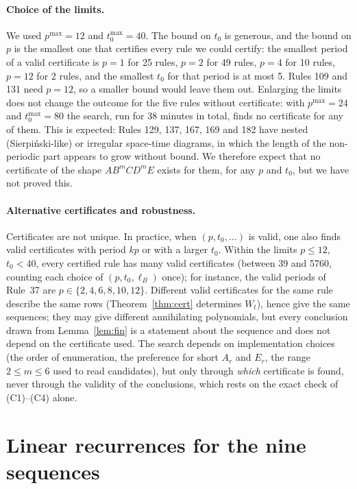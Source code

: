 \documentclass[11pt]{article}
\theoremstyle{definition}
\theoremstyle{remark}
\begin{document}
\paragraph{Choice of the limits.} We used $p^{\max}=12$ and $t_0^{\max}=40$. The bound on $t_0$ is generous, and the bound on $p$ is the smallest one that certifies every rule we could certify: the smallest period of a valid certificate is $p=1$ for 25 rules, $p=2$ for 49 rules, $p=4$ for 10 rules, $p=12$ for 2 rules, and the smallest $t_0$ for that period is at most 5. Rules 109 and 131 need $p=12$, so a smaller bound would leave them out. Enlarging the limits does not change the outcome for the five rules without certificate: with $p^{\max}=24$ and $t_0^{\max}=80$ the search, run for 38 minutes in total, finds no certificate for any of them. This is expected: Rules 129, 137, 167, 169 and 182 have nested (Sierpi\'nski-like) or irregular space-time diagrams, in which the length of the non-periodic part appears to grow without bound. We therefore expect that no certificate of the shape $AB^mCD^mE$ exists for them, for any $p$ and $t_0$, but we have not proved this.

\paragraph{Alternative certificates and robustness.} Certificates are not unique. In practice, when $(p,t_0,\dots)$ is valid, one also finds valid certificates with period $kp$ or with a larger $t_0$. Within the limits $p\le12$, $t_0<40$, every certified rule has many valid certificates (between 39 and 5760, counting each choice of $(p,t_0,\ell_B)$ once); for instance, the valid periods of Rule~37 are $p\in\{2,4,6,8,10,12\}$. Different valid certificates for the same rule describe the same rows (Theorem~\ref{thm:cert} determines $W_t$), hence give the same sequences; they may give different annihilating polynomials, but every conclusion drawn from Lemma~\ref{lem:fin} is a statement about the sequence and does not depend on the certificate used. The search depends on implementation choices (the order of enumeration, the preference for short $A_r$ and $E_r$, the range $2\le m\le6$ used to read candidates), but only through \emph{which} certificate is found, never through the validity of the conclusions, which rests on the exact check of (C1)--(C4) alone.


\section{Linear recurrences for the nine sequences}
\end{document}
